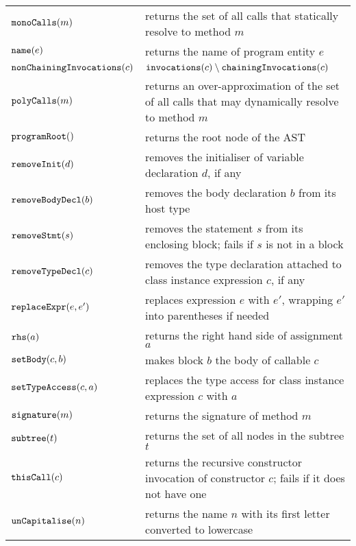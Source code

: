 \begin{center}
\begin{supertabular}{|l|p{10cm}|}
$\text{\texttt{monoCalls}}(m)$ & returns the set of all calls that statically resolve to method $m$ \\
$\text{\texttt{name}}(e)$ & returns the name of program entity $e$ \\
$\text{\texttt{nonChainingInvocations}}(c)$ & $\text{\texttt{invocations}}(c)\setminus\text{\texttt{chainingInvocations}}(c)$ \\
$\text{\texttt{polyCalls}}(m)$ & returns an over-approximation of the set of all calls that may dynamically resolve to method $m$ \\
$\text{\texttt{programRoot}}()$ & returns the root node of the AST \\
$\text{\texttt{removeInit}}(d)$ & removes the initialiser of variable declaration $d$, if any \\
$\text{\texttt{removeBodyDecl}}(b)$ & removes the body declaration $b$ from its host type \\
$\text{\texttt{removeStmt}}(s)$ & removes the statement $s$ from its enclosing block; fails if $s$ is not in a block \\
$\text{\texttt{removeTypeDecl}}(c)$ & removes the type declaration attached to class instance expression $c$, if any \\
$\text{\texttt{replaceExpr}}(e, e')$ & replaces expression $e$ with $e'$, wrapping $e'$ into parentheses if needed \\
$\text{\texttt{rhs}}(a)$ & returns the right hand side of assignment $a$ \\
$\text{\texttt{setBody}}(c, b)$ & makes block $b$ the body of callable $c$ \\
$\text{\texttt{setTypeAccess}}(c, a)$ & replaces the type access for class instance expression $c$ with $a$ \\
$\text{\texttt{signature}}(m)$ & returns the signature of method $m$ \\
$\text{\texttt{subtree}}(t)$ & returns the set of all nodes in the subtree $t$ \\
$\text{\texttt{thisCall}}(c)$ & returns the recursive constructor invocation of constructor $c$; fails if it does not have one \\
$\text{\texttt{unCapitalise}}(n)$ & returns the name $n$ with its first letter converted to lowercase \\
\hline
\end{supertabular}
\end{center}

